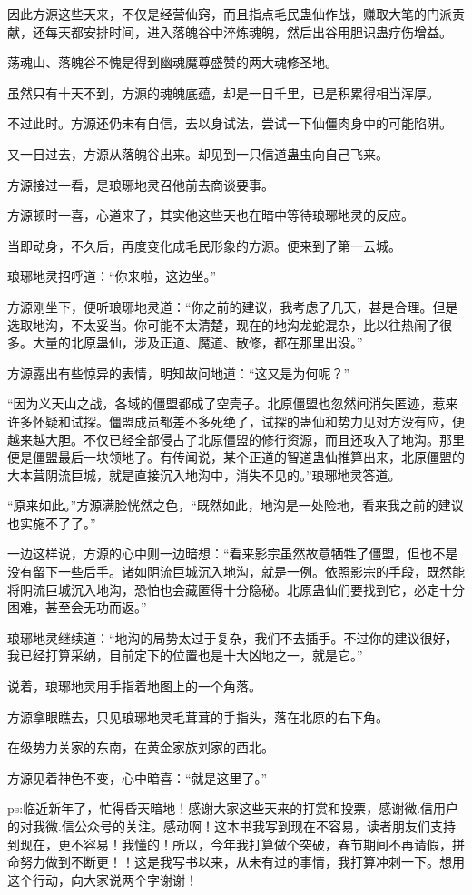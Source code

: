 \begin{this_body}
因此方源这些天来，不仅是经营仙窍，而且指点毛民蛊仙作战，赚取大笔的门派贡献，还每天都安排时间，进入落魄谷中淬炼魂魄，然后出谷用胆识蛊疗伤增益。

荡魂山、落魄谷不愧是得到幽魂魔尊盛赞的两大魂修圣地。

虽然只有十天不到，方源的魂魄底蕴，却是一日千里，已是积累得相当浑厚。

不过此时。方源还仍未有自信，去以身试法，尝试一下仙僵肉身中的可能陷阱。

又一日过去，方源从落魄谷出来。却见到一只信道蛊虫向自己飞来。

方源接过一看，是琅琊地灵召他前去商谈要事。

方源顿时一喜，心道来了，其实他这些天也在暗中等待琅琊地灵的反应。

当即动身，不久后，再度变化成毛民形象的方源。便来到了第一云城。

琅琊地灵招呼道：“你来啦，这边坐。”

方源刚坐下，便听琅琊地灵道：“你之前的建议，我考虑了几天，甚是合理。但是选取地沟，不太妥当。你可能不太清楚，现在的地沟龙蛇混杂，比以往热闹了很多。大量的北原蛊仙，涉及正道、魔道、散修，都在那里出没。”

方源露出有些惊异的表情，明知故问地道：“这又是为何呢？”

“因为义天山之战，各域的僵盟都成了空壳子。北原僵盟也忽然间消失匿迹，惹来许多怀疑和试探。僵盟成员都差不多死绝了，试探的蛊仙和势力见对方没有应，便越来越大胆。不仅已经全部侵占了北原僵盟的修行资源，而且还攻入了地沟。那里便是僵盟最后一块领地了。有传闻说，某个正道的智道蛊仙推算出来，北原僵盟的大本营阴流巨城，就是直接沉入地沟中，消失不见的。”琅琊地灵答道。

“原来如此。”方源满脸恍然之色，“既然如此，地沟是一处险地，看来我之前的建议也实施不了了。”

一边这样说，方源的心中则一边暗想：“看来影宗虽然故意牺牲了僵盟，但也不是没有留下一些后手。诸如阴流巨城沉入地沟，就是一例。依照影宗的手段，既然能将阴流巨城沉入地沟，恐怕也会藏匿得十分隐秘。北原蛊仙们要找到它，必定十分困难，甚至会无功而返。”

琅琊地灵继续道：“地沟的局势太过于复杂，我们不去插手。不过你的建议很好，我已经打算采纳，目前定下的位置也是十大凶地之一，就是它。”

说着，琅琊地灵用手指着地图上的一个角落。

方源拿眼瞧去，只见琅琊地灵毛茸茸的手指头，落在北原的右下角。

在级势力关家的东南，在黄金家族刘家的西北。

方源见着神色不变，心中暗喜：“就是这里了。”

ps:临近新年了，忙得昏天暗地！感谢大家这些天来的打赏和投票，感谢微.信用户的对我微.信公众号的关注。感动啊！这本书我写到现在不容易，读者朋友们支持到现在，更不容易！我懂的！所以，今年我打算做个突破，春节期间不再请假，拼命努力做到不断更！！这是我写书以来，从未有过的事情，我打算冲刺一下。想用这个行动，向大家说两个字谢谢！

\end{this_body}

